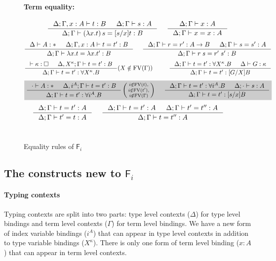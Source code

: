 \documentclass[preprint]{sigplanconf}
\newcommand{\newFi}[1]{\colorbox{grey}{\ensuremath{#1}}}
\newcommand{\Fi}{\ensuremath{\mathsf{F}_i}}
\newcommand{\FV}{\mathop{\mathrm{FV}}}
\theoremstyle{plain}
\theoremstyle{remark}
\theoremstyle{definition}
\begin{document}
\begin{figure*}
\paragraph{Term equality:} 
$ \qquad
 ~~~~
   \inference{\Delta;\Gamma,x:A |- t:B & \Delta;\Gamma |- s:A}
             {\Delta;\Gamma |- (\lambda x.t)\,s=[s/x]t : B}
 ~~~~
   \inference{\Delta;\Gamma |- x:A}{\Delta;\Gamma |- x=x:A}
$
\[ \inference{\Delta |- A:* & \Delta;\Gamma,x:A |- t=t':B}
             {\Delta;\Gamma |- \lambda x.t = \lambda x.t':B}
 ~~~~
   \inference{\Delta;\Gamma |- r=r':A-> B & \Delta;\Gamma |- s=s':A}
             {\Delta;\Gamma |- r\;s=r'\;s':B}
\]
\[ \inference{|- \kappa:\square & \Delta, X^\kappa;\Gamma |- t=t' : B}
             {\Delta;\Gamma |- t=t' : \forall X^\kappa.B}
	     (X\notin\FV(\Gamma))
 ~~~~ ~~~~
   \inference{ \Delta;\Gamma |- t=t' : \forall X^\kappa.B
             & \Delta |- G:\kappa }
             {\Delta;\Gamma |- t=t' : [G/X]B}
\]
\[ \newFi{
   \inference{\cdot |- A:* & \Delta, i^A;\Gamma |- t=t' : B}
             {\Delta;\Gamma |- t=t' : \forall i^A.B}
   \left(\begin{smallmatrix}
		i\notin\FV(t),\\
		i\notin\FV(t'),\\
		i\notin\FV(\Gamma)\end{smallmatrix}\right)
 ~~~~
   \inference{ \Delta;\Gamma |- t=t' : \forall i^A.B
             & \Delta;\cdot |- s:A}
             {\Delta;\Gamma |- t=t' : [s/x]B} }
\]
\[ \inference{\Delta;\Gamma |- t=t':A}{\Delta;\Gamma |- t'=t:A}
 ~~~~
   \inference{\Delta;\Gamma |- t=t':A & \Delta;\Gamma |- t'=t'':A}
             {\Delta;\Gamma |- t=t'':A}
\]
~\\
\caption{Equality rules of \Fi}
\label{fig:eqFi}
\end{figure*}

\subsection{The constructs new to \Fi}

\paragraph{Typing contexts}
Typing contexts are split into two parts:
type level contexts ($\Delta$) for type level bindings
and term level contexts ($\Gamma$) for term level bindings.
We have a new form of index variable bindings ($i^A$) that can appear in
type level contexts in addition to type variable bindings ($X^\kappa$).
There is only one form of term level binding ($x:A$) that can appear in
term level contexts.
\end{document}

